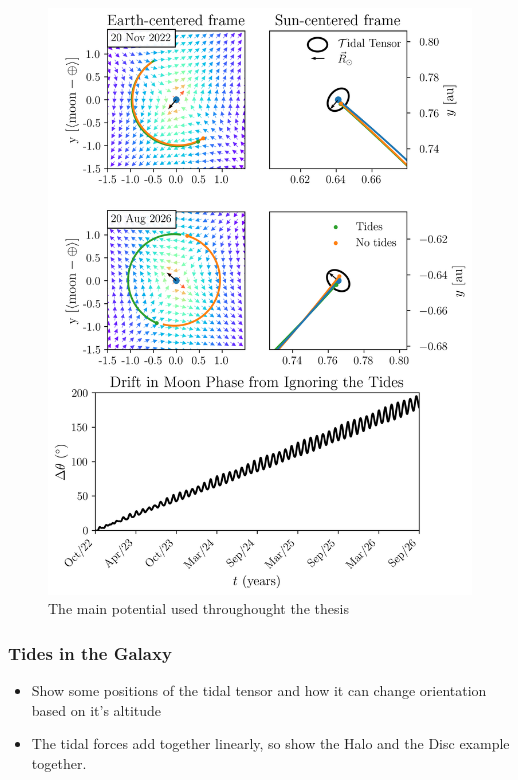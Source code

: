             \begin{figure}
                \centering
                \includegraphics[width=\linewidth]{images/moon_tidal_simulation.png}
                \caption{The main potential used throughought the thesis}
            \end{figure}

        \subsubsection*{Tides in the Galaxy}
            \begin{itemize}
                \item Show some positions of the tidal tensor and how it can change orientation based on it's altitude 
                \item The tidal forces add together linearly, so show the Halo and the Disc example together. 
            \end{itemize}

